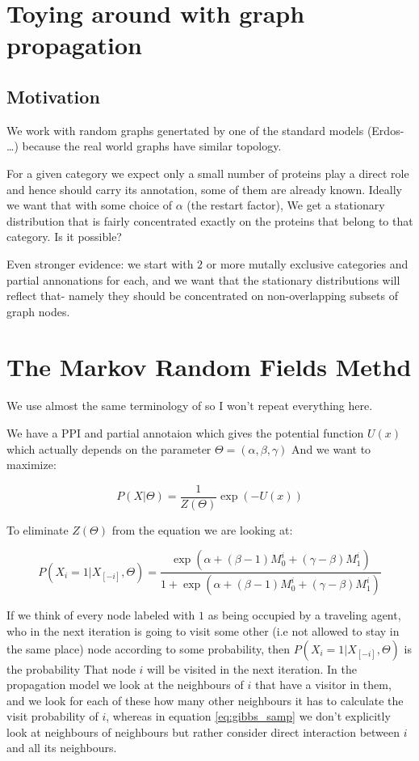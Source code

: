 \documentclass[a4paper,10pt]{article}
\theoremstyle{definition}
\theoremstyle{remark}
\theoremstyle{plain}
\begin{document}
\section{Toying around with graph propagation}
\subsection{Motivation}
We work with random graphs genertated by one of the standard models (Erdos- \dots)
because the real world graphs have similar topology.

For a given category we expect only a small number of proteins play a direct role and hence should carry
its annotation, some of them are already known. Ideally we want that with some choice of $\alpha$ (the restart factor),
We get a stationary distribution that is fairly concentrated exactly on the proteins that belong to that category.
Is it possible?

Even stronger evidence: we start with $2$ or more mutally exclusive categories and partial annonations for each,
and we want that the stationary distributions will reflect that- namely they should be concentrated on non-overlapping subsets
of graph nodes.



\section{The Markov Random Fields Methd}
We use almost the same terminology of \textcite{deng2002prediction}
so I won't repeat everything here.

We have a PPI and partial annotaion which gives the potential function $U(x)$
which actually depends on the parameter $\Theta =(\alpha, \beta, \gamma)$
And we want to maximize:

\begin{equation} \label{eq:gibbs_dist}
P(X | \Theta) = \frac{1}{Z(\Theta)}\exp(-U(x))
\end{equation}

To eliminate $Z(\Theta)$ from the equation we are looking at:

\begin{equation} \label{eq:gibbs_samp}
P(X_i=1 | X_{[-i]}, \Theta) =
\frac{\exp(\alpha + (\beta -1)M_0^{i} + (\gamma - \beta)M_1^{i})}{
1 + \exp(\alpha + (\beta -1)M_0^{i} + (\gamma - \beta)M_1^{i})}
\end{equation}

If we think of every node labeled with $1$ as being occupied by a traveling
agent, who in the next iteration is going to visit some other (i.e not allowed
to stay in the same place) node according to some
probability, then $P(X_i = 1 | X_{[-i]}, \Theta)$ is the probability 
That node $i$ will be visited in the next iteration. In the propagation model
we look at the neighbours of $i$ that have a visitor in them, and we 
look for each of these how many other neighbours it has to calculate the 
visit probability of $i$, whereas in equation \eqref{eq:gibbs_samp} we don't
explicitly look at neighbours of neighbours but rather consider direct
interaction between $i$ and all its neighbours.
\end{document}
